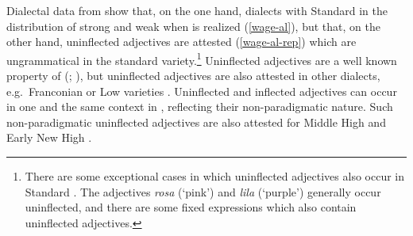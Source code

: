 \documentclass[output=paper,colorlinks,citecolor=brown]{langscibook}
\begin{document}
Dialectal data from  show that, on the one hand, dialects  with Standard  in the distribution of strong and weak  when  is realized (\ref{wage-al}), but that, on the other hand, uninflected  adjectives are attested (\ref{wage-al-rep}) which are ungrammatical in the standard variety.\footnote{There are some exceptional cases in which uninflected adjectives also occur in Standard . The adjectives \textit{rosa} (`pink') and \textit{lila} (`purple') generally occur uninflected, and there are some fixed expressions which also contain uninflected adjectives.} Uninflected adjectives are a well known property of  (\citealp[158]{birlinger1868alemannische}; \citealp[19--20]{Staedele1927}), but uninflected adjectives are also attested in other dialects, e.g.~Franconian \citep{Rowley1991} or Low  varieties \citep{Schirmunski1962}. Uninflected and inflected adjectives can occur in one and the same context in , reflecting their non-paradigmatic nature. Such non-paradigmatic uninflected adjectives are also attested for Middle High  \citep{klein2007semantischen} and Early New High  \citep{SolmsWegera1991}. %

\ea {} \label{wage-al}
\z
\z 
\newpage
\ea {}  \label{wage-al-rep}
\z
\z 
\end{document}
